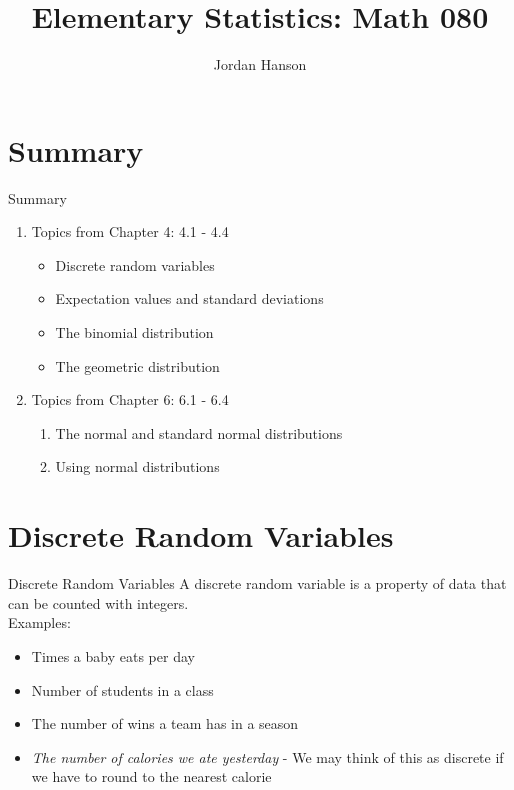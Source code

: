 \documentclass{beamer}
\title{Elementary Statistics: Math 080}
\author{Jordan Hanson}
\institute{Whittier College Department of Physics and Astronomy}
\begin{document}
\maketitle

\section{Summary}

\begin{frame}{Summary}
\begin{enumerate}
\item Topics from Chapter 4: 4.1 - 4.4
\begin{itemize}
\item Discrete random variables
\item Expectation values and standard deviations
\item The binomial distribution
\item The geometric distribution
\end{itemize}
\item Topics from Chapter 6: 6.1 - 6.4
\begin{enumerate}
\item The normal and standard normal distributions
\item Using normal distributions
\end{enumerate}
\end{enumerate}
\end{frame}

\section{Discrete Random Variables}

\begin{frame}{Discrete Random Variables}
A \alert{discrete random variable} is a property of data that can be counted with integers. \\ \vspace{0.5cm} Examples:
\begin{itemize}
\item Times a baby eats per day
\item Number of students in a class
\item The number of wins a team has in a season
\item \textit{The number of calories we ate yesterday} - We may think of this as discrete if we have to round to the nearest calorie
\end{itemize}
\end{frame}
\end{document}
